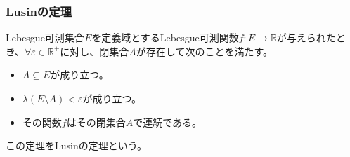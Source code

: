 \documentclass[dvipdfmx]{jsarticle}
\begin{document}
\subsubsection{Lusinの定理}%
\begin{thm}[Lusinの定理]\label{4.5.5.26}
Lebesgue可測集合$E$を定義域とするLebesgue可測関数$f:E \rightarrow \mathbb{R}$が与えられたとき、$\forall\varepsilon \in \mathbb{R}^{+}$に対し、閉集合$A$が存在して次のことを満たす。
\begin{itemize}
\item
  $A \subseteq E$が成り立つ。
\item
  $\lambda(E \setminus A) < \varepsilon$が成り立つ。
\item
  その関数$f$はその閉集合$A$で連続である。
\end{itemize}
この定理をLusinの定理という。
\end{thm}
\end{document}
